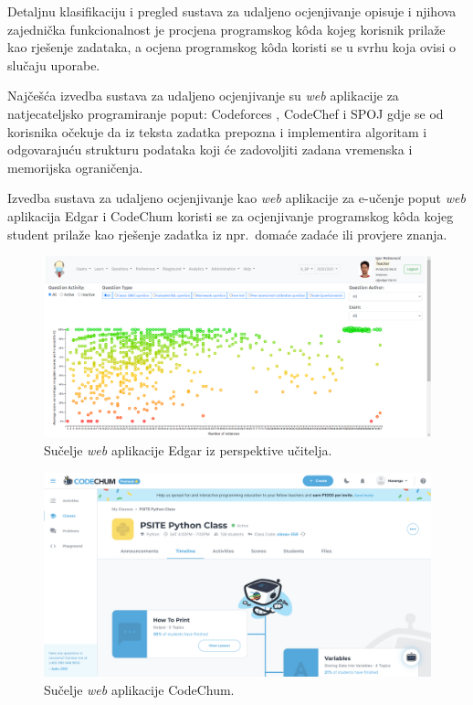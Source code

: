 \documentclass[times, utf8, diplomski]{fer}
\begin{document}
Detaljnu klasifikaciju i pregled sustava za udaljeno ocjenjivanje opisuje \citep{wasik2018survey} i njihova zajednička funkcionalnost je procjena  programskog kôda kojeg korisnik prilaže kao rješenje zadataka, a ocjena  programskog kôda koristi se u svrhu koja ovisi o slučaju uporabe.

Najčešća izvedba sustava za udaljeno ocjenjivanje su \textit{web} aplikacije za natjecateljsko programiranje poput: Codeforces \citep{Codeforces}, CodeChef \citep{CodeChef} i SPOJ \citep{SPOJ} gdje se od korisnika očekuje da iz teksta zadatka prepozna i implementira algoritam i odgovarajuću strukturu podataka koji će zadovoljiti zadana vremenska i memorijska ograničenja. 

Izvedba sustava za udaljeno ocjenjivanje kao \textit{web} aplikacije za e-učenje poput \textit{web} aplikacija Edgar \citep{mekterovic2020building} i CodeChum \citep{maranga2019codechum} koristi se za ocjenjivanje  programskog kôda kojeg student prilaže kao rješenje zadatka iz npr.\ domaće zadaće ili provjere znanja.

\begin{figure}[htb]
	\centering
	\includegraphics[width=\textwidth]{images/edgar-ui.png}
	\caption{
		Sučelje \textit{web} aplikacije Edgar iz perspektive učitelja.
	}
	\label{fig:edgar-ui}
\end{figure}

\begin{figure}[htb]
	\centering
	\includegraphics[width=\textwidth]{images/codechum-ui.png}
	\caption{
		Sučelje \textit{web} aplikacije CodeChum.
	}
	\label{fig:edgar-ui}
\end{figure}
\end{document}
